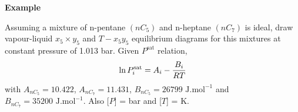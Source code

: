   \medskip
   \begin{MyExample}{\begin{center}{\bf Example}\end{center}}
     \begin{example}\label{Chapter:VLE:Example2}
       Assuming a mixture of n-pentane $\left(nC_{5}\right)$ and n-heptane $\left(nC_{7}\right)$ is ideal, draw vapour-liquid $x_{5}\times y_{5}$ and $T-x_{5}y_{5}$ equilibrium diagrams for this mixtures at constant pressure of 1.013 bar. Given $P^{\text{sat}}$ relation,
    \begin{displaymath}
      \ln{P_{i}^{\text{sat}}} = A_{i} - \displaystyle\frac{B_{i}}{RT}
    \end{displaymath}
    with $A_{nC_{5}}=10.422$, $A_{nC_{7}}=11.431$, $B_{nC_{5}}=26799 \text{ J.mol}^{-1}$ and $B_{nC_{7}}=35200 \text{ J.mol}^{-1}$. Also [$P$] = bar and [$T$] = K.
     \end{example}


\end{MyExample}
